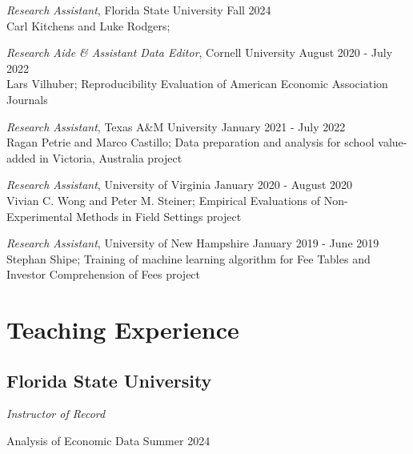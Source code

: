 \documentclass[letterpaper]{article}
\renewenvironment{itemize}{
  \begin{list}{}{
    \setlength{\leftmargin}{1.5em}
  }
}{
  \end{list}
}
\begin{document}
\begin{itemize}
    \item \textit{Research Assistant}, Florida State University \hfill Fall 2024 \\
    Carl Kitchens and Luke Rodgers;  
    
    \item \textit{Research Aide \& Assistant Data Editor}, Cornell University \hfill August 2020 - July 2022 \\
    Lars Vilhuber; Reproducibility Evaluation of American Economic Association Journals 

    \item \textit{Research Assistant}, Texas A\&M University \hfill January 2021 - July 2022 \\
    Ragan Petrie and Marco Castillo;  Data preparation and analysis for school value-added in Victoria, Australia project

    \item \textit{Research Assistant}, University of Virginia \hfill January 2020 - August 2020 \\
    Vivian C. Wong and Peter M. Steiner; Empirical Evaluations of Non-Experimental Methods in Field Settings project

    \item \textit{Research Assistant}, University of New Hampshire \hfill January 2019 - June 2019 \\
    Stephan Shipe; Training of machine learning algorithm for Fee Tables and Investor Comprehension of Fees project

\end{itemize}

\section*{Teaching Experience}

\subsection*{Florida State University}

\begin{itemize}

    \item \textit{Instructor of Record} 

    \hspace{10pt} Analysis of Economic Data \hfill Summer 2024
    
\end{itemize}
\end{document}

